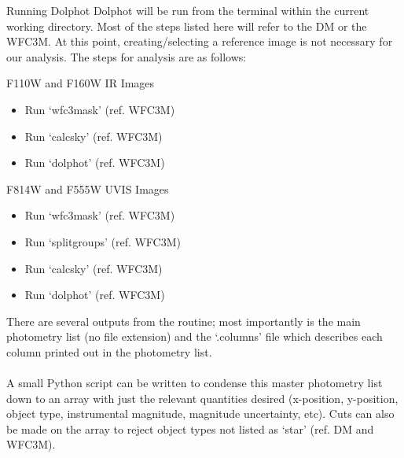 \documentclass[12pt]{article}
\begin{document}
\begin{section}{Running Dolphot}
Dolphot will be run from the terminal within the current working directory. Most of the steps listed here will refer to the DM or the WFC3M. At this point, creating/selecting a reference image is not necessary for our analysis. The steps for analysis are as follows: \\
\begin{subsection}{F110W and F160W IR Images}
\begin{itemize}
\item Run `wfc3mask' (ref. WFC3M)
\item Run `calcsky' (ref. WFC3M)
\item Run `dolphot' (ref. WFC3M)
\end{itemize}
\end{subsection}

\begin{subsection}{F814W and F555W UVIS Images}
\begin{itemize}
\item Run `wfc3mask' (ref. WFC3M)
\item Run `splitgroups' (ref. WFC3M)
\item Run `calcsky' (ref. WFC3M)
\item Run `dolphot' (ref. WFC3M)
\end{itemize}
\end{subsection}
There are several outputs from the routine; most importantly is the main photometry list (no file extension) and the `.columns' file which describes each column printed out in the photometry list. \\
\\
A small Python script can be written to condense this master photometry list down to an array with just the relevant quantities desired (x-position, y-position, object type, instrumental magnitude, magnitude uncertainty, etc). Cuts can also be made on the array to reject object types not listed as `star' (ref. DM and WFC3M).

\end{section}
\end{document}
